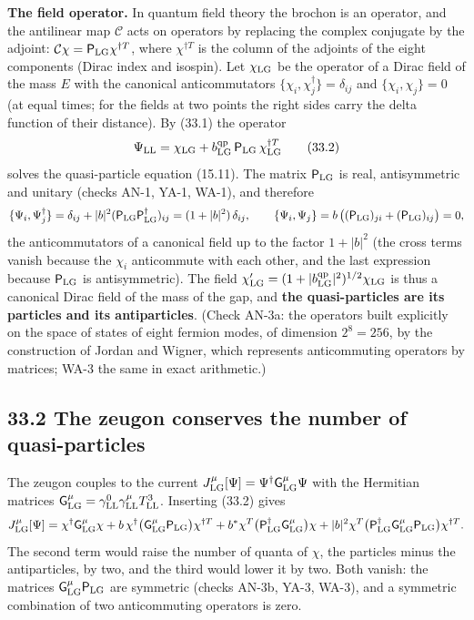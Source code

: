 \documentclass[
  10pt,
]{article}
\begin{document}
\textbf{The field operator.} In quantum field theory the brochon is an
operator, and the antilinear map \(\mathcal C\) acts on operators by
replacing the complex conjugate by the adjoint:
\(\mathcal C\chi=\mathsf P_{\rm LG}\chi^{\dagger T}\), where
\(\chi^{\dagger T}\) is the column of the adjoints of the eight
components (Dirac index and isospin). Let \(\chi_{\rm LG}\) be the
operator of a Dirac field of the mass \(E\) with the canonical
anticommutators \(\{\chi_i,\chi_j^\dagger\}=\delta_{ij}\) and
\(\{\chi_i,\chi_j\}=0\) (at equal times; for the fields at two points
the right sides carry the delta function of their distance). By (33.1)
the operator
\[\Psi_{\rm LL}=\chi_{\rm LG}+b^{\rm qp}_{\rm LG}\,\mathsf P_{\rm LG}\,\chi_{\rm LG}^{\dagger T}\tag{33.2}\]
solves the quasi-particle equation (15.11). The matrix
\(\mathsf P_{\rm LG}\) is real, antisymmetric and unitary (checks AN-1,
YA-1, WA-1), and therefore
\[\{\Psi_i,\Psi_j^\dagger\}=\delta_{ij}+\lvert b\rvert^2(\mathsf P_{\rm LG}\mathsf P_{\rm LG}^\dagger)_{ij}=(1+\lvert b\rvert^2)\,\delta_{ij},\qquad\{\Psi_i,\Psi_j\}=b\,\big((\mathsf P_{\rm LG})_{ji}+(\mathsf P_{\rm LG})_{ij}\big)=0,\]
the anticommutators of a canonical field up to the factor
\(1+\lvert b\rvert^2\) (the cross terms vanish because the \(\chi_i\)
anticommute with each other, and the last expression because
\(\mathsf P_{\rm LG}\) is antisymmetric). The field
\(\chi'_{\rm LG}=(1+\lvert b^{\rm qp}_{\rm LG}\rvert^2)^{1/2}\chi_{\rm LG}\)
is thus a canonical Dirac field of the mass of the gap, and \textbf{the
quasi-particles are its particles and its antiparticles}. (Check AN-3a:
the operators built explicitly on the space of states of eight fermion
modes, of dimension \(2^8=256\), by the construction of Jordan and
Wigner, which represents anticommuting operators by matrices; WA-3 the
same in exact arithmetic.)

\hypertarget{the-zeugon-conserves-the-number-of-quasi-particles}{%
\subsection{33.2 The zeugon conserves the number of
quasi-particles}\label{the-zeugon-conserves-the-number-of-quasi-particles}}

The zeugon couples to the current
\(J^\mu_{\rm LG}[\Psi]=\Psi^\dagger\mathsf G^\mu_{\rm LG}\Psi\) with the
Hermitian matrices
\(\mathsf G^\mu_{\rm LG}=\gamma^0_{\rm LL}\gamma^\mu_{\rm LL}T^3_{\rm LL}\).
Inserting (33.2) gives
\[J^\mu_{\rm LG}[\Psi]=\chi^\dagger\mathsf G^\mu_{\rm LG}\chi+b\,\chi^\dagger\big(\mathsf G^\mu_{\rm LG}\mathsf P_{\rm LG}\big)\chi^{\dagger T}+b^*\chi^T\big(\mathsf P_{\rm LG}^\dagger\mathsf G^\mu_{\rm LG}\big)\chi+\lvert b\rvert^2\chi^T\big(\mathsf P_{\rm LG}^\dagger\mathsf G^\mu_{\rm LG}\mathsf P_{\rm LG}\big)\chi^{\dagger T}.\]
The second term would raise the number of quanta of \(\chi\), the
particles minus the antiparticles, by two, and the third would lower it
by two. Both vanish: the matrices
\(\mathsf G^\mu_{\rm LG}\mathsf P_{\rm LG}\) are symmetric (checks
AN-3b, YA-3, WA-3), and a symmetric combination of two anticommuting
operators is zero.
\end{document}
